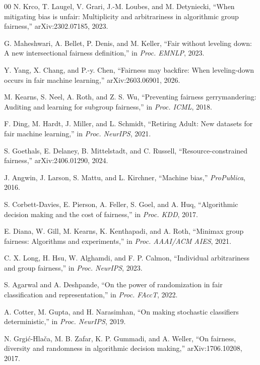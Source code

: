 \documentclass[9pt,conference]{IEEEtran}
\begin{document}
\begin{thebibliography}{00}
 N. Krco, T. Laugel, V. Grari, J.-M. Loubes, and M. Detyniecki, ``When
mitigating bias is unfair: Multiplicity and arbitrariness in algorithmic group fairness,''
arXiv:2302.07185, 2023.

 G. Maheshwari, A. Bellet, P. Denis, and M. Keller, ``Fair without
leveling down: A new intersectional fairness definition,'' in \emph{Proc. EMNLP}, 2023.

 Y. Yang, X. Chang, and P.-y. Chen, ``Fairness may backfire: When
leveling-down occurs in fair machine learning,'' arXiv:2603.06901, 2026.

 M. Kearns, S. Neel, A. Roth, and Z. S. Wu, ``Preventing fairness
gerrymandering: Auditing and learning for subgroup fairness,'' in \emph{Proc. ICML}, 2018.

 F. Ding, M. Hardt, J. Miller, and L. Schmidt, ``Retiring Adult: New datasets
for fair machine learning,'' in \emph{Proc. NeurIPS}, 2021.

 S. Goethals, E. Delaney, B. Mittelstadt, and C. Russell,
``Resource-constrained fairness,'' arXiv:2406.01290, 2024.

 J. Angwin, J. Larson, S. Mattu, and L. Kirchner, ``Machine bias,''
\emph{ProPublica}, 2016.

 S. Corbett-Davies, E. Pierson, A. Feller, S. Goel, and A. Huq,
``Algorithmic decision making and the cost of fairness,'' in \emph{Proc. KDD}, 2017.

 E. Diana, W. Gill, M. Kearns, K. Kenthapadi, and A. Roth, ``Minimax group
fairness: Algorithms and experiments,'' in \emph{Proc. AAAI/ACM AIES}, 2021.

 C. X. Long, H. Hsu, W. Alghamdi, and F. P. Calmon, ``Individual
arbitrariness and group fairness,'' in \emph{Proc. NeurIPS}, 2023.

 S. Agarwal and A. Deshpande, ``On the power of randomization in fair
classification and representation,'' in \emph{Proc. FAccT}, 2022.

 A. Cotter, M. Gupta, and H. Narasimhan, ``On making stochastic
classifiers deterministic,'' in \emph{Proc. NeurIPS}, 2019.

 N. Grgi\'{c}-Hla\v{c}a, M. B. Zafar, K. P. Gummadi, and A. Weller,
``On fairness, diversity and randomness in algorithmic decision making,''
arXiv:1706.10208, 2017.


\end{thebibliography}
\end{document}
